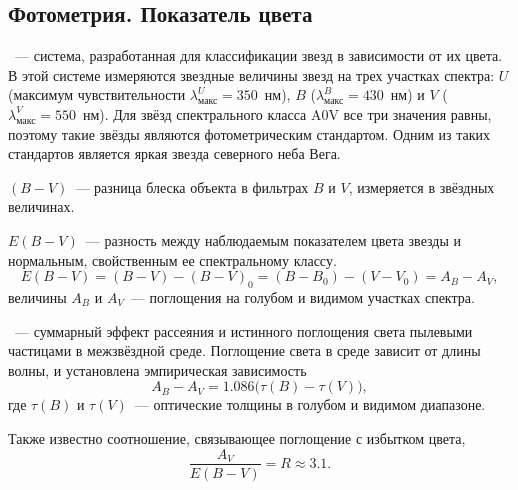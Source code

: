 \subsection{Фотометрия. Показатель цвета}
~--- система, разработанная для классификации звезд в зависимости от их цвета. В этой системе измеряются звездные величины звезд на трех участках спектра: $U$ (максимум чувствительности $\lambda_\text{макс}^U = 350$~нм), $B$ ($\lambda_\text{макс}^B = 430$~нм) и $V$ ($\lambda_\text{макс}^V = 550$~нм). Для звёзд спектрального класса A0V все три значения равны, поэтому такие звёзды являются фотометрическим стандартом. Одним из таких стандартов является яркая звезда северного неба Вега.

 $(B-V)$~--- разница блеска объекта в фильтрах $B$ и $V$, измеряется в звёздных величинах. 


 $E\left(B - V\right)$~--- разность между наблюдаемым показателем цвета звезды и нормальным, свойственным ее спектральному классу.
\begin{equation}
E\left(B - V\right) = \left(B - V\right) - \left(B - V\right)_0 = \left(B - B_0\right) - \left(V - V_0\right) = A_B - A_V,
\end{equation}
величины $A_B$ и $A_V$~--- поглощения на голубом и видимом участках спектра.

~--- суммарный эффект рассеяния и истинного поглощения света пылевыми частицами в межзвёздной среде. Поглощение света в среде зависит от длины волны, и установлена эмпирическая зависимость
\begin{equation}
A_B - A_V = 1.086 \bigl(\tau\left(B\right) - \tau\left(V\right)\bigr),
\end{equation}
где $\tau\left(B\right)$ и $\tau\left(V\right)$~---  оптические толщины в голубом и видимом диапазоне.

Также известно соотношение, связывающее поглощение с избытком цвета,
\begin{equation}
\frac{A_V}{E\left(B - V\right)} = R \approx 3.1.
\end{equation}